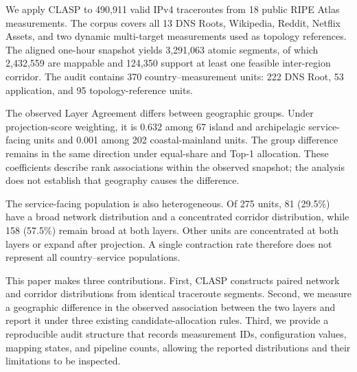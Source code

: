 We apply CLASP to 490,911 valid IPv4 traceroutes from 18 public RIPE Atlas
measurements. The corpus covers all 13 DNS Roots, Wikipedia, Reddit, Netflix
Assets, and two dynamic multi-target measurements used as topology references.
The aligned one-hour snapshot yields 3,291,063 atomic segments, of which
2,432,559 are mappable and 124,350 support at least one feasible inter-region
corridor. The audit contains 370 country--measurement units: 222 DNS Root, 53
application, and 95 topology-reference units.

The observed Layer Agreement differs between geographic groups. Under
projection-score weighting, it is 0.632 among 67 island and archipelagic
service-facing units and 0.001 among 202 coastal-mainland units. The group
difference remains in the same direction under equal-share and Top-1
allocation. These coefficients describe rank associations within the observed
snapshot; the analysis does not establish that geography causes the
difference.

The service-facing population is also heterogeneous. Of 275 units, 81 (29.5\%)
have a broad network distribution and a concentrated corridor distribution,
while 158 (57.5\%) remain broad at both layers. Other units are concentrated at
both layers or expand after projection. A single contraction rate therefore
does not represent all country--service populations.

This paper makes three contributions. First, CLASP constructs paired network
and corridor distributions from identical traceroute segments. Second, we
measure a geographic difference in the observed association between the two
layers and report it under three existing candidate-allocation rules. Third,
we provide a reproducible audit structure that records measurement IDs,
configuration values, mapping states, and pipeline counts, allowing the
reported distributions and their limitations to be inspected.
